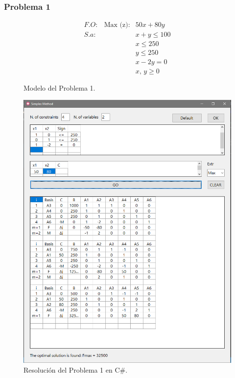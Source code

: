 \documentclass[a4paper, 12pt]{article}
\begin{document}
    \subsubsection{Problema 1}
    \begin{figure}[H]
        \[\begin{matrix}
            F\!.\!O:&\text{Max (z)}:&50x+80y\\
            S.\!a: &&x+y\leq 100\\
            &&x\leq 250\\
            &&y\leq 250\\
            &&x-2y=0\\
            &&x,\, y\geq 0
        \end{matrix}\]
        \caption{Modelo del Problema 1.}
    \end{figure}
    \begin{figure}[H]
        \centering
        \includegraphics[width=12cm]{problema1.PNG}
        \caption{Resolución del Problema 1 en C\#.}
    \end{figure}
\end{document}
